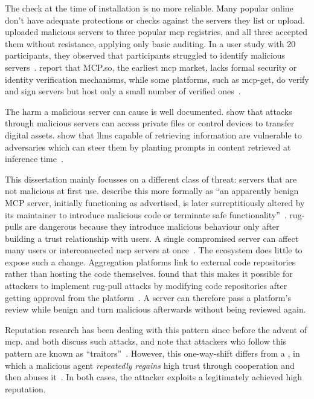 The check at the time of installation is no more reliable. Many popular online  don't have adequate protections or checks against the servers they list or upload. \textcite{Song2026} uploaded malicious servers to three popular \gls{mcp} registries, and all three accepted them without resistance, applying only basic auditing. In a user study with 20 participants, they observed that participants struggled to identify malicious servers~\cite[p.~2411]{Song2026}. \textcite{Hou2026} report that MCP.so, the earliest \gls{mcp} market, lacks formal security or identity verification mechanisms, while some platforms, such as mcp-get, do verify and sign servers but host only a small number of verified ones~\cite[pp.~11--12]{Hou2026}.

The harm a malicious server can cause is well documented. \textcite{Song2026} show that attacks through malicious servers can access private files or control devices to transfer digital assets. \textcite{Greshake2023} show that \glspl{llm} capable of retrieving information are vulnerable to adversaries which can steer them by planting prompts in content retrieved at inference time~\cite[p.~80]{Greshake2023}.

This dissertation mainly focusses on a different class of threat: servers that are not malicious at first use. \textcite{Hou2026} describe this more formally as \enquote{an apparently benign MCP server, initially functioning as advertised, is later surreptitiously altered by its maintainer to introduce malicious code or terminate safe functionality}~\cite[p.~19]{Hou2026}. \Glspl{rug-pull} are dangerous because they introduce malicious behaviour only after building a trust relationship with users. A single compromised server can affect many users or interconnected \gls{mcp} servers at once~\cite[p.~19]{Hou2026}. The ecosystem does little to expose such a change. Aggregation platforms link to external code repositories rather than hosting the code themselves. \textcite{Song2026} found that this makes it possible for attackers to implement \gls{rug-pull} attacks by modifying code repositories after getting approval from the platform~\cite[p.~2415]{Song2026}. A server can therefore pass a platform's review while benign and turn malicious afterwards without being reviewed again.

Reputation research has been dealing with this pattern since before the advent of \gls{mcp}. \textcite{Hoffman2009} and \textcite{Ruohomaa2011} both discuss such attacks, and \textcite{Hoffman2009} note that attackers who follow this pattern are known as \enquote{\glspl{traitor}}~\cite[p.~1:13]{Hoffman2009}. However, this \gls{one-way-shift} differs from a , in which a malicious agent \textit{repeatedly regains} high trust through cooperation and then abuses it~\cite[p.~842]{Salehi-Abari2010}. In both cases, the attacker exploits a legitimately achieved high reputation.

